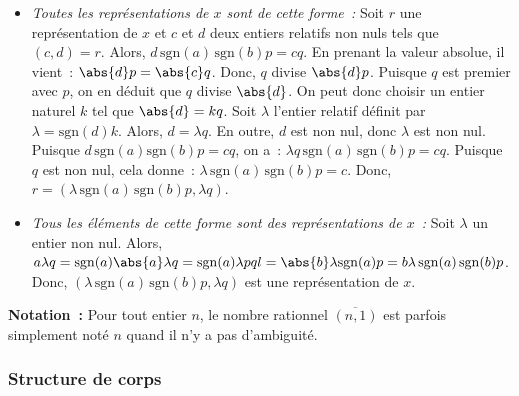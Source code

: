 \begin{itemize}[nosep]
        \begin{itemize}[nosep]
            \item \emph{Toutes les représentations de $x$ sont de cette forme :} Soit $r$ une représentation de $x$ et $c$ et $d$ deux entiers relatifs non nuls tels que $(c, d) = r$. 
                Alors, $d \, \mathrm{sgn}(a) \, \mathrm{sgn}(b) p = c q$.
                En prenant la valeur absolue, il vient : $\abs{d} p = \abs{c} q$. 
                Donc, $q$ divise $\abs{d} p$. 
                Puisque $q$ est premier avec $p$, on en déduit que $q$ divise $\abs{d}$.
                On peut donc choisir un entier naturel $k$ tel que $\abs{d} = k q$.
                Soit $\lambda$ l'entier relatif définit par $\lambda = \mathrm{sgn}(d) k$. 
                Alors, $d = \lambda q$.
                En outre, $d$ est non nul, donc $\lambda$ est non nul. 
                Puisque $d \, \mathrm{sgn}(a) \mathrm{sgn}(b) p = c q$, on a : $\lambda q \, \mathrm{sgn}(a) \, \mathrm{sgn}(b) p = c q$.
                Puisque $q$ est non nul, cela donne : $\lambda \, \mathrm{sgn}(a) \, \mathrm{sgn}(b) p = c$.
                Donc, $r = (\lambda \, \mathrm{sgn}(a) \, \mathrm{sgn}(b) p, \lambda q)$.
            \item \emph{Tous les éléments de cette forme sont des représentations de $x$ :} Soit $\lambda$ un entier non nul.
                Alors, $a \lambda q = \mathrm{sgn}(a) \abs{a} \lambda q = \mathrm{sgn}(a) \lambda p q l = \abs{b} \lambda \mathrm{sgn}(a) p = b \lambda \, \mathrm{sgn}(a) \, \mathrm{sgn}(b) p$.
                Donc, $(\lambda \, \mathrm{sgn}(a) \, \mathrm{sgn}(b) p, \lambda q)$ est une représentation de $x$.
        \end{itemize}
\end{itemize}

\done

\medskip

\noindent\textbf{Notation :} Pour tout entier $n$, le nombre rationnel $\overline{(n, 1)}$ est parfois simplement noté $n$ quand il n'y a pas d'ambiguité.

\subsubsection{Structure de corps}

